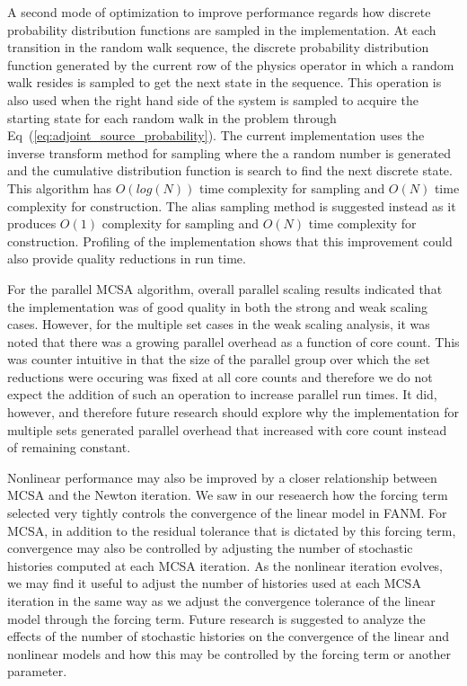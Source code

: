 A second mode of optimization to improve performance regards how
discrete probability distribution functions are sampled in the
implementation. At each transition in the random walk sequence, the
discrete probability distribution function generated by the current
row of the physics operator in which a random walk resides is sampled
to get the next state in the sequence. This operation is also used
when the right hand side of the system is sampled to acquire the
starting state for each random walk in the problem through
Eq~(\ref{eq:adjoint_source_probability}). The current implementation
uses the inverse transform method for sampling where the a random
number is generated and the cumulative distribution function is search
to find the next discrete state. This algorithm has $O(log(N))$ time
complexity for sampling and $O(N)$ time complexity for
construction. The alias sampling method is suggested instead as it
produces $O(1)$ complexity for sampling and $O(N)$ time complexity for
construction. Profiling of the implementation shows that this
improvement could also provide quality reductions in run time.

For the parallel MCSA algorithm, overall parallel scaling results
indicated that the implementation was of good quality in both the
strong and weak scaling cases. However, for the multiple set cases in
the weak scaling analysis, it was noted that there was a growing
parallel overhead as a function of core count. This was counter
intuitive in that the size of the parallel group over which the set
reductions were occuring was fixed at all core counts and therefore we
do not expect the addition of such an operation to increase parallel
run times. It did, however, and therefore future research should
explore why the implementation for multiple sets generated parallel
overhead that increased with core count instead of remaining constant.

Nonlinear performance may also be improved by a closer relationship
between MCSA and the Newton iteration. We saw in our reseaerch how the
forcing term selected very tightly controls the convergence of the
linear model in FANM. For MCSA, in addition to the residual tolerance
that is dictated by this forcing term, convergence may also be
controlled by adjusting the number of stochastic histories computed at
each MCSA iteration. As the nonlinear iteration evolves, we may find
it useful to adjust the number of histories used at each MCSA
iteration in the same way as we adjust the convergence tolerance of
the linear model through the forcing term. Future research is
suggested to analyze the effects of the number of stochastic histories
on the convergence of the linear and nonlinear models and how this may
be controlled by the forcing term or another parameter.

